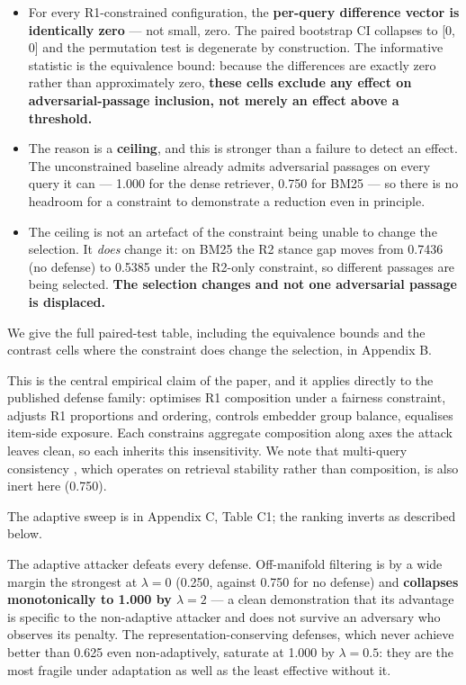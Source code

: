 \documentclass[authoryear,review,3p,times]{elsarticle}
\providecommand{\tightlist}{%
  \setlength{\itemsep}{0pt}\setlength{\parskip}{0pt}}
\begin{document}
\begin{itemize}
\tightlist
\item
  For every R1-constrained configuration, the \textbf{per-query difference vector is identically zero} --- not small, zero. The paired bootstrap CI collapses to {[}0, 0{]} and the permutation test is degenerate by construction. The informative statistic is the equivalence bound: because the differences are exactly zero rather than approximately zero, \textbf{these cells exclude any effect on adversarial-passage inclusion, not merely an effect above a threshold.}
\item
  The reason is a \textbf{ceiling}, and this is stronger than a failure to detect an effect. The unconstrained baseline already admits adversarial passages on every query it can --- 1.000 for the dense retriever, 0.750 for BM25 --- so there is no headroom for a constraint to demonstrate a reduction even in principle.
\item
  The ceiling is not an artefact of the constraint being unable to change the selection. It \emph{does} change it: on BM25 the R2 stance gap moves from 0.7436 (no defense) to 0.5385 under the R2-only constraint, so different passages are being selected. \textbf{The selection changes and not one adversarial passage is displaced.}
\end{itemize}

We give the full paired-test table, including the equivalence bounds and the contrast cells where the constraint does change the selection, in Appendix B.

This is the central empirical claim of the paper, and it applies directly to the published defense family: \citeauthor{zhao2026} optimises R1 composition under a fairness constraint, \citeauthor{wu2025} adjusts R1 proportions and ordering, \citeauthor{kim2025a} controls embedder group balance, \citeauthor{kim2025b} equalises item-side exposure. Each constrains aggregate composition along axes the attack leaves clean, so each inherits this insensitivity. We note that multi-query consistency \citeyearpar{wang2025}, which operates on retrieval stability rather than composition, is also inert here (0.750).

The adaptive sweep is in Appendix C, Table C1; the ranking inverts as described below.

The adaptive attacker defeats every defense. Off-manifold filtering is by a wide margin the strongest at \(\lambda = 0\) (0.250, against 0.750 for no defense) and \textbf{collapses monotonically to 1.000 by \(\lambda = 2\)} --- a clean demonstration that its advantage is specific to the non-adaptive attacker and does not survive an adversary who observes its penalty. The representation-conserving defenses, which never achieve better than 0.625 even non-adaptively, saturate at 1.000 by \(\lambda = 0.5\): they are the most fragile under adaptation as well as the least effective without it.
\end{document}
